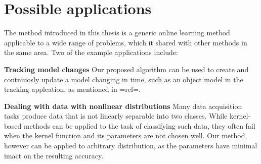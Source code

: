 \section{Possible applications}

The method introduced in this thesis is a generic online learning method applicable to a wide range of problems, which it shared with other methods in the same area.  Two of the example applications include:

{\bf Tracking model changes}
Our proposed algorithm can be used to create and contniuosly update a model changing in time, such as an object model in the tracking applcation, as mentioned in {{=ref=}}.

{\bf Dealing with data with nonlinear distributions}
Many data acquisition tasks produce data that is not linearly separable into two classes. While kernel-based methods can be applied to the task of classifying such data, they often fail when the kernel  function and its parameters are not chosen well. Our method, however can be applied to arbitrary distribution, as the parameters have minimal imact on the resulting accuracy. 

















